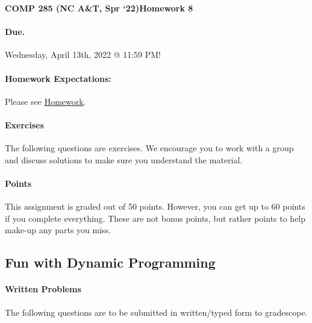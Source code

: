 \documentclass [12pt]{article}
\begin{document}
 

{\LARGE \textbf{COMP 285 (NC A\&T, Spr `22)}\hfill \textbf{Homework 8} } 
\vspace{1em} 
\begin{Instruction} 

\paragraph{Due.} Wednesday, April 13th, 2022 @ 11:59 PM!
\end{Instruction} 

\vspace{1em} 
\begin{Instruction} \paragraph{Homework Expectations:} Please see \href{https://www.comp285.ml/homework/#general-homework-information}{Homework}.
\end{Instruction}

\vspace{1em} 
\begin{Instruction} 

\paragraph{Exercises} The following questions are exercises. We encourage you to work with a group and discuss solutions to make sure you understand the material.

\paragraph{Points} This assignment is graded out of 50 points. However, you can get up to 60 points if you complete everything. These are not bonus points, but rather points to help make-up any parts you miss.

\end{Instruction} 

\begin{centering}
\section*{Fun with Dynamic Programming}
\end{centering}

\begin{Instruction}

\paragraph{Written Problems} The following questions are to be submitted in written/typed form to gradescope.

\end{Instruction}
\end{document}
